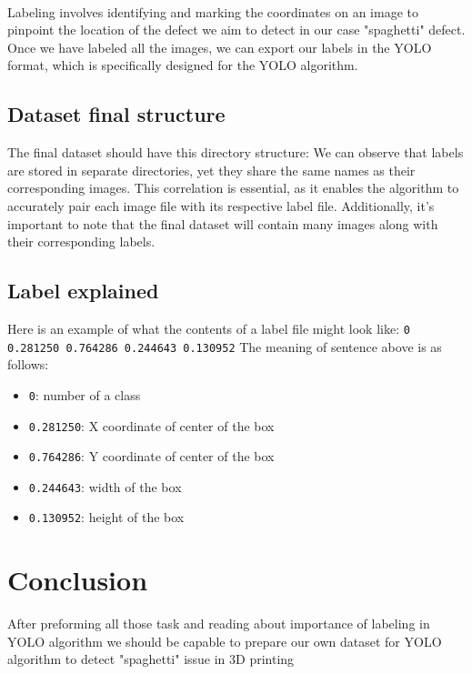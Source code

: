 \documentclass[12pt,a4paper]{article}
\begin{document}
\\Labeling involves identifying and marking the coordinates on an image to pinpoint the location of the defect we aim to detect in our case "spaghetti" defect. Once we have labeled all the images, we can export our labels in the YOLO format, which is specifically designed for the YOLO algorithm. 
\subsection{Dataset final structure}

The final dataset should have this directory structure:
{}
We can observe that labels are stored in separate directories, yet they share the same names as their corresponding images. This correlation is essential, as it enables the algorithm to accurately pair each image file with its respective label file. Additionally, it's important to note that the final dataset will contain many images along with their corresponding labels.

\subsection{Label explained}
\noindent
Here is an example of what the contents of a label file might look like: \smallbreak
\verb|0 0.281250 0.764286 0.244643 0.130952| \smallbreak
\noindent
The meaning of sentence above is as follows: 
\begin{itemize}
    \item \verb|0|: number of a class
    \item \verb|0.281250|: X coordinate of center of the box
    \item \verb|0.764286|: Y coordinate of center of the box
    \item \verb|0.244643|: width of the box
    \item \verb|0.130952|: height of the box
\end{itemize}

\section{Conclusion}
After preforming all those task and reading about importance of labeling in YOLO algorithm we should be capable to prepare our own dataset for YOLO algorithm to detect "spaghetti" issue in 3D printing
\end{document}
